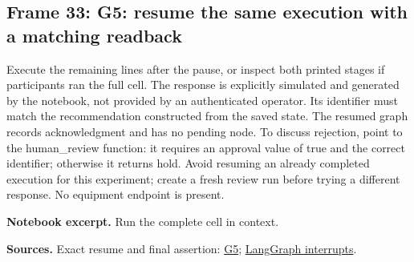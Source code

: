 \documentclass[11pt]{article}
\begin{document}
\subsection*{Frame 33: G5: resume the same execution with a matching readback}
Execute the remaining lines after the pause, or inspect both printed stages if participants ran the full cell. The response is explicitly simulated and generated by the notebook, not provided by an authenticated operator. Its identifier must match the recommendation constructed from the saved state. The resumed graph records acknowledgment and has no pending node. To discuss rejection, point to the human\_review function: it requires an approval value of true and the correct identifier; otherwise it returns hold. Avoid resuming an already completed execution for this experiment; create a fresh review run before trying a different response. No equipment endpoint is present.\par
\par\noindent\begin{minipage}{\linewidth}\textbf{Notebook excerpt.} Run the complete cell in context.\par \end{minipage}\par
\par\nopagebreak\begin{minipage}{\linewidth}{\footnotesize\color{slate}\textbf{Sources.} Exact resume and final assertion: \href{../Graph_Workflow_Lab.ipynb}{G5}; \href{https://docs.langchain.com/oss/python/langgraph/interrupts}{LangGraph interrupts}.\par}\end{minipage}\par\medskip
\end{document}
